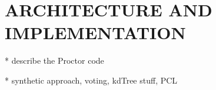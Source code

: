 \section{ARCHITECTURE AND IMPLEMENTATION}
* describe the Proctor code

* synthetic approach, voting, kdTree stuff, PCL

